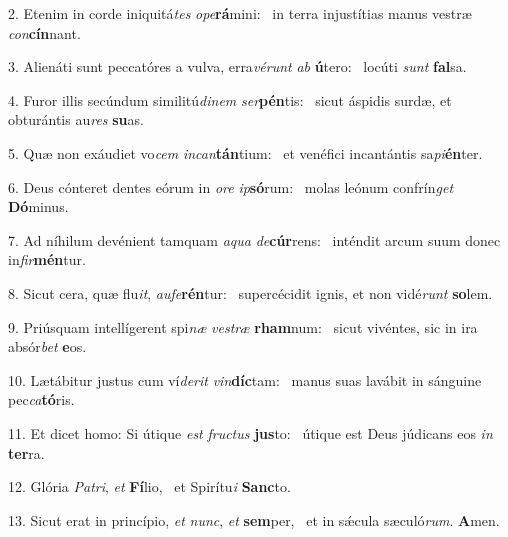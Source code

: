 2. Etenim in corde iniquitá\textit{tes} \textit{o}\textit{pe}\textbf{rá}mini: \ast\  in terra injustítias manus vestræ \textit{con}\textbf{cín}nant.\

3. Alienáti sunt peccatóres a vulva, erra\textit{vé}\textit{runt} \textit{ab} \textbf{ú}tero: \ast\  locúti \textit{sunt} \textbf{fal}sa.\

4. Furor illis secúndum similitú\textit{di}\textit{nem} \textit{ser}\textbf{pén}tis: \ast\  sicut áspidis surdæ, et obturántis au\textit{res} \textbf{su}as.\

5. Quæ non exáudiet vo\textit{cem} \textit{in}\textit{can}\textbf{tán}tium: \ast\  et venéfici incantántis sa\textit{pi}\textbf{én}ter.\

6. Deus cónteret dentes eórum in \textit{o}\textit{re} \textit{ip}\textbf{só}rum: \ast\  molas leónum confrín\textit{get} \textbf{Dó}minus.\

7. Ad níhilum devénient tamquam \textit{a}\textit{qua} \textit{de}\textbf{cúr}rens: \ast\  inténdit arcum suum donec in\textit{fir}\textbf{mén}tur.\

8. Sicut cera, quæ flu\textit{it}, \textit{au}\textit{fe}\textbf{rén}tur: \ast\  supercécidit ignis, et non vidé\textit{runt} \textbf{so}lem.\

9. Priúsquam intellígerent spi\textit{næ} \textit{ves}\textit{træ} \textbf{rham}num: \ast\  sicut vivéntes, sic in ira absór\textit{bet} \textbf{e}os.\

10. Lætábitur justus cum ví\textit{de}\textit{rit} \textit{vin}\textbf{díc}tam: \ast\  manus suas lavábit in sánguine pec\textit{ca}\textbf{tó}ris.\

11. Et dicet homo: Si útique \textit{est} \textit{fruc}\textit{tus} \textbf{jus}to: \ast\  útique est Deus júdicans eos \textit{in} \textbf{ter}ra.\

12. Glória \textit{Pa}\textit{tri}, \textit{et} \textbf{Fí}lio, \ast\  et Spirítu\textit{i} \textbf{Sanc}to.\

13. Sicut erat in princípio, \textit{et} \textit{nunc}, \textit{et} \textbf{sem}per, \ast\  et in sǽcula sæculó\textit{rum}. \textbf{A}men.\


